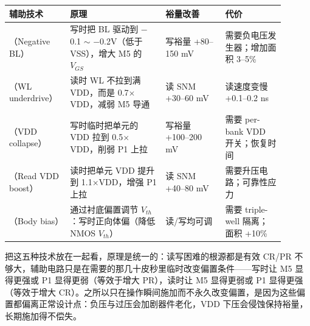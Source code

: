 \begin{longtable}{L{0.18\linewidth}L{0.32\linewidth}L{0.20\linewidth}L{0.20\linewidth}}
\toprule
辅助技术 & 原理 & 裕量改善 & 代价 \\
\midrule
{}（Negative BL） & 写时把 BL 驱动到 $-$0.1 $\sim$ $-$0.2V（低于 VSS），增大 M5 的 $V_{GS}$ & 写裕量 +80--150 mV & 需要负电压发生器；增加面积 3--5\% \\\tablerowrule
{}（WL underdrive） & 读时 WL 不拉到满 VDD，而是 0.7$\times$VDD，减弱 M5 导通 & 读 SNM +30--60 mV & 读速度变慢 +0.1--0.2 ns \\\tablerowrule
{}（VDD collapse） & 写时临时把单元的 VDD 拉到 0.5$\times$VDD，削弱 P1 上拉 & 写裕量 +100--200 mV & 需要 per-bank VDD 开关；恢复时间 \\\tablerowrule
{}（Read VDD boost） & 读时把单元 VDD 提升到 1.1$\times$VDD，增强 P1 上拉 & 读 SNM +40--80 mV & 需要升压电路；可靠性应力 \\\tablerowrule
{}（Body bias） & 通过衬底偏置调节 $V_{th}$：写时正向体偏（降低 NMOS $V_{th}$） & 读/写均可调 & 需要 triple-well 隔离；面积 +10\% \\
\bottomrule
\end{longtable}

把这五种技术放在一起看，原理是统一的：读写困难的根源都是有效 CR/PR 不够大，辅助电路只是在需要的那几十皮秒里临时改变偏置条件——写时让 M5 显得更强或 P1 显得更弱（等效于增大 PR），读时让 M5 显得更弱或 P1 显得更强（等效于增大 CR）。之所以只在操作瞬间施加而不永久改变偏置，是因为这些偏置都偏离正常设计点：负压与过压会加剧器件老化，VDD 下压会侵蚀保持裕量，长期施加得不偿失。

